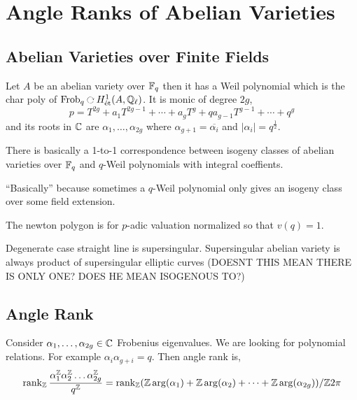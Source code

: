 \documentclass[12pt]{article}
\begin{document}
\section{Angle Ranks of Abelian Varieties}

\subsection{Abelian Varieties over Finite Fields}

\newcommand{\Frob}{\mathrm{Frob}}
\newcommand{\ol}[1]{\overline{#1}}

Let $A$ be an abelian variety over $\mathbb{F}_q$ then it has a Weil polynomial which is the char poly of $\Frob_q \acts H^1_{\et}(A, \Q_\ell)$. It is monic of degree $2g$,
\[ p = T^{2g} + a_1 T^{2g-1} + \cdots + a_g T^g + q a_{g-1} T^{g-1} + \cdots + q^g \]
and its roots in $\mathbb{C}$ are $\alpha_1, \dots, \alpha_{2g}$ where $\alpha_{g+1} = \ol{\alpha_i}$ and $| \alpha_i | = q^{\frac{1}{2}}$. 

\begin{thm}
There is basically a 1-to-1 correspondence between isogeny classes of abelian varieties over $\mathbb{F}_q$ and $q$-Weil polynomials with integral coeffients.
\end{thm}

\begin{rmk}
``Basically'' because sometimes a $q$-Weil polynomial only gives an isogeny class over some field extension. 
\end{rmk}

The newton polygon is for $p$-adic valuation normalized so that $v(q) = 1$.


\begin{rmk}
Degenerate case straight line is supersingular. Supersingular abelian variety is always product of supersingular elliptic curves (DOESNT THIS MEAN THERE IS ONLY ONE? DOES HE MEAN ISOGENOUS TO?)
\end{rmk}

\subsection{Angle Rank}

Consider $\alpha_1, \dots, \alpha_{2g} \in \mathbb{C}$ Frobenius eigenvalues. We are looking for polynomial relations. For example $\alpha_i \alpha_{g+i} = q$. Then angle rank is,
\[ \operatorname{\mathrm{rank}}_{\mathbb{Z}} \frac{\alpha_1^{\mathbb{Z}} \alpha_2^{\mathbb{Z}} \dots \alpha_{2g}^{\mathbb{Z}}}{q^{\mathbb{Z}}} = \operatorname{\mathrm{rank}}_{\mathbb{Z}} (\mathbb{Z} \arg(\alpha_1) + \mathbb{Z} \arg(\alpha_2) + \cdots + \mathbb{Z} \arg(\alpha_{2g})) / \mathbb{Z} 2\pi  \]
\end{document}
